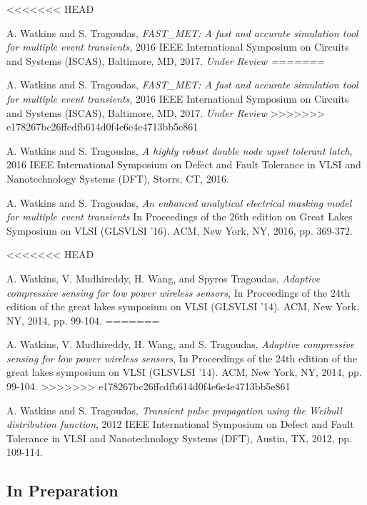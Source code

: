 \documentclass[letterpaper]{article}
\renewenvironment{itemize}{
  \begin{list}{}{
    \setlength{\leftmargin}{1.5em}
  }
}{
  \end{list}
}
\begin{document}
\begin{itemize}
<<<<<<< HEAD
\item A. Watkins and S. Tragoudas, \emph{FAST\_MET: A fast and accurate simulation tool for multiple event transients}, 2016 IEEE International Symposium on Circuits and Systems (ISCAS), Baltimore, MD, 2017. \it{Under Review}
=======
\item A. Watkins and S. Tragoudas, \emph{FAST\_MET: A fast and accurate simulation tool for multiple event transients}, 2016 IEEE International Symposium on Circuits and Systems (ISCAS), Baltimore, MD, 2017. \emph{Under Review}
>>>>>>> e178267bc26ffcdfb614d0f4e6e4e4713bb5e861
	
\item A. Watkins and S. Tragoudas, \emph{A highly robust double node upset tolerant latch}, 2016 IEEE International Symposium on Defect and Fault Tolerance in VLSI and Nanotechnology Systems (DFT), Storrs, CT, 2016.
	
\item A. Watkins and S. Tragoudas, \emph{An enhanced analytical electrical masking model for multiple event transients} In Proceedings of the 26th edition on Great Lakes Symposium on VLSI (GLSVLSI '16). ACM, New York, NY, 2016, pp. 369-372.
	
<<<<<<< HEAD
\item A. Watkins, V. Mudhireddy, H. Wang, and Spyros Tragoudas, \emph{Adaptive compressive sensing for low power wireless sensors}, In Proceedings of the 24th edition of the great lakes symposium on VLSI (GLSVLSI '14). ACM, New York, NY, 2014, pp. 99-104.
=======
\item A. Watkins, V. Mudhireddy, H. Wang, and S. Tragoudas, \emph{Adaptive compressive sensing for low power wireless sensors}, In Proceedings of the 24th edition of the great lakes symposium on VLSI (GLSVLSI '14). ACM, New York, NY, 2014, pp. 99-104.
>>>>>>> e178267bc26ffcdfb614d0f4e6e4e4713bb5e861
	
\item A. Watkins and S. Tragoudas, \emph{Transient pulse propagation using the Weibull distribution function}, 2012 IEEE International Symposium on Defect and Fault Tolerance in VLSI and Nanotechnology Systems (DFT), Austin, TX, 2012, pp. 109-114.
\end{itemize}

\subsection*{In Preparation}
\end{document}
